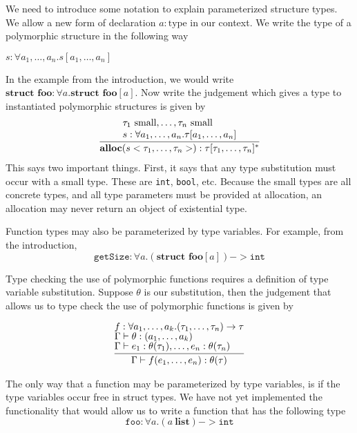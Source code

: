 \documentclass[aps,letterpaper,11pt]{revtex4}
\begin{document}
We need to introduce some notation to explain parameterized structure types. We allow a new form of declaration
$a : \text{type}$ in our context. We write the type of a polymorphic structure in the following way

\begin{center}
$s : \forall a_1, \ldots, a_n. s[a_1, \ldots, a_n]$
\end{center}

In the example from the introduction, we would write $\textbf{struct foo} : \forall a. \textbf{struct foo}[a]$.
Now write the judgement which gives a type to instantiated polymorphic structures is given by
\[
\begin{tabular}{c}
  \infer{\textbf{alloc}(s <\tau_1, \ldots, \tau_n>) : \tau[\tau_1, \dots, \tau_n]^*}
        {	
        	{\tau_1~\text{small}, \ldots, \tau_n~\text{small}} \vspace{.1cm}\\
			{s : \forall a_1, \ldots, a_n. \tau[a_1, \ldots, a_n]}
        }
\end{tabular}
\]
This says two important things. First, it says that any type substitution must occur with a small type.
These are \texttt{int}, \texttt{bool}, etc. Because the small types are all concrete types, and all type
parameters must be provided at allocation, an allocation may never return an object of existential type.

Function types may also be parameterized by type variables. For example, from the introduction,
$$\texttt{getSize} : \forall a. (\textbf{struct foo}[a]) -> \texttt{int}$$

Type checking the use of polymorphic functions requires a definition of type variable substitution. Suppose
$\theta$ is our substitution, then the judgement that allows us to type check the use of polymorphic
functions is given by

\[
\begin{tabular}{c}
  \infer{\Gamma \vdash f(e_1, \ldots, e_n) : \theta(\tau)}
        {	
        	{f : \forall a_1, \ldots, a_k. (\tau_1, \ldots, \tau_n) \rightarrow \tau}\\
			{\Gamma \vdash \theta : (a_1, \ldots, a_k)}\\
			{\Gamma \vdash e_1 : \theta(\tau_1), \ldots, e_n : \theta(\tau_n)}
        }
\end{tabular}
\]

The only way that a function may be parameterized by type variables, is if the type variables occur free in
struct types. We have not yet implemented the functionality that would allow us to write a function that
has the following type
$$\texttt{foo} : \forall a. (a~\textbf{list}) -> \texttt{int}$$
\end{document}

